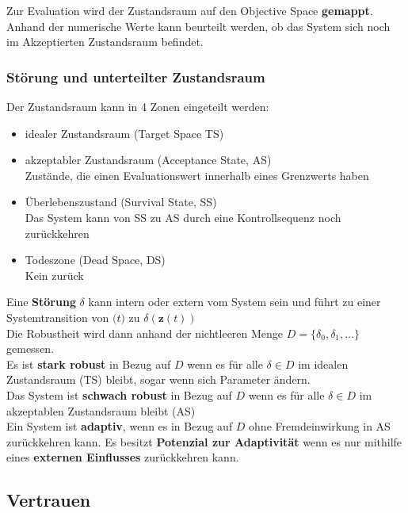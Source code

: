 \documentclass[a4paper]{article}
\begin{document}
Zur Evaluation wird der Zustandsraum auf den Objective Space \textbf{gemappt}. Anhand der numerische Werte kann beurteilt werden, ob das System sich noch im Akzeptierten Zustandsraum befindet.

\subsubsection{Störung und unterteilter Zustandsraum}
Der Zustandsraum kann in 4 Zonen eingeteilt werden:
\begin{itemize}
	\item idealer Zustandsraum (Target Space TS)
	\item akzeptabler Zustandsraum (Acceptance State, AS)\\
	Zustände, die einen Evaluationswert innerhalb eines Grenzwerts haben
	\item Überlebenszustand (Survival State, SS)\\
	Das System kann von SS zu AS durch eine Kontrollsequenz noch zurückkehren
	\item Todeszone (Dead Space, DS)\\
	Kein zurück
\end{itemize}

Eine \textbf{Störung} $\delta$ kann intern oder extern vom System sein und führt zu einer Systemtransition von $\mathbf(t)$ zu $\delta(\mathbf{z}(t))$\\

Die Robustheit wird dann anhand der nichtleeren Menge $D=\{\delta_0, \delta_1,\dots  \}$ gemessen.\\
Es ist \textbf{stark robust} in Bezug auf $D$ wenn es für alle $\delta \in D$ im idealen Zustandsraum (TS) bleibt, sogar wenn sich Parameter ändern.\\
 Das System ist \textbf{schwach robust} in Bezug auf $D$ wenn es für alle $\delta \in D$ im akzeptablen Zustandsraum bleibt (AS)\\
 
 Ein System ist \textbf{adaptiv}, wenn es in Bezug auf $D$ ohne Fremdeinwirkung in AS zurückkehren kann. Es besitzt \textbf{Potenzial zur Adaptivität} wenn es nur mithilfe eines \textbf{externen Einflusses} zurückkehren kann.











































\subsection{Vertrauen}
\end{document}

